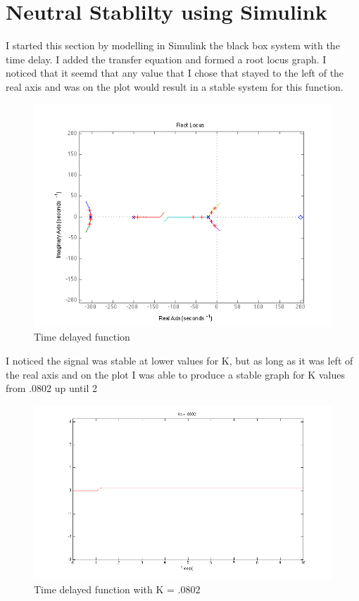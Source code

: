 \documentclass[english]{article}
\begin{document}
\section{Neutral Stablilty using Simulink} 
I started this section by modelling in Simulink the black box system with the time delay. 
I added the transfer equation and formed a root locus graph. I noticed that it seemd that any value that I chose that stayed to the left  of the real axis and was on the plot would result in a stable system for this function. 
\begin{figure}[h!]
\includegraphics[width = \linewidth]{rlocusnstable.png}
\caption{Time delayed function}
\end{figure}
\FloatBarrier
I noticed the signal was stable at lower values for K, but as long as it was left of the real axis and on the plot I was able to produce a stable graph for K values from .0802 up until 2  
\begin{figure}[h!]
\includegraphics[width = \linewidth]{lownstable.png}
\caption{Time delayed function with K = .0802}
\end{figure}
\end{document}
